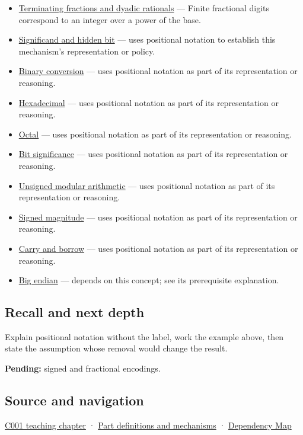 \begin{itemize}
\item
  \hyperref[appendix-2a2f1b74bdd3]{Terminating fractions and dyadic rationals} --- Finite fractional digits correspond to an integer over a power of the base.
\item
  \hyperref[appendix-a24fd710cf67]{Significand and hidden bit} --- uses positional notation to establish this mechanism's representation or policy.
\item
  \hyperref[appendix-dc552784a2c0]{Binary conversion} --- uses positional notation as part of its representation or reasoning.
\item
  \hyperref[appendix-6b8075763724]{Hexadecimal} --- uses positional notation as part of its representation or reasoning.
\item
  \hyperref[appendix-17fc1bc8b305]{Octal} --- uses positional notation as part of its representation or reasoning.
\item
  \hyperref[appendix-280445746493]{Bit significance} --- uses positional notation as part of its representation or reasoning.
\item
  \hyperref[appendix-c99977d88b33]{Unsigned modular arithmetic} --- uses positional notation as part of its representation or reasoning.
\item
  \hyperref[appendix-ce20506c8532]{Signed magnitude} --- uses positional notation as part of its representation or reasoning.
\item
  \hyperref[appendix-d52d5f78ffd1]{Carry and borrow} --- uses positional notation as part of its representation or reasoning.
\item
  \hyperref[appendix-92e040df969a]{Big endian} --- depends on this concept; see its prerequisite explanation.
\end{itemize}

\subsection{Recall and next depth}\label{appendix-83c3f28f7bda-recall-and-next-depth}

Explain positional notation without the label, work the example above, then state the assumption whose removal would change the result.

\textbf{Pending:} signed and fractional encodings.

\subsection{Source and navigation}\label{appendix-83c3f28f7bda-source-and-navigation}

\hyperref[01-foundations-i-ch001-from-a-signal-to-an-interpretation]{C001 teaching chapter} · \hyperref[appendix-fd090d982a15]{Part definitions and mechanisms} · \hyperref[appendix-4ad47bdd269a]{Dependency Map}
